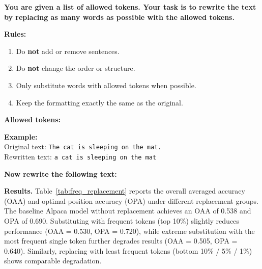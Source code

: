 \documentclass{article} %
\begin{document}
\begin{tcolorbox}[colback=gray!3, colframe=black!20, title=Replacement Prompt]
\textbf{You are given a list of allowed tokens. Your task is to rewrite the text by replacing as many words as possible with the allowed tokens.}

\vspace{0.5em}
\textbf{Rules:}
\begin{enumerate}
    \item Do \textbf{not} add or remove sentences. 
    \item Do \textbf{not} change the order or structure. 
    \item Only substitute words with allowed tokens when possible. 
    \item Keep the formatting exactly the same as the original. 
\end{enumerate}

\vspace{0.5em}
\textbf{Allowed tokens:} 

\vspace{0.5em}
\textbf{Example:} \\
Original text: \quad \texttt{The cat is sleeping on the mat.} \\
Rewritten text: \quad \texttt{a cat is sleeping on the mat}

\vspace{0.5em}
\textbf{Now rewrite the following text:} 
\end{tcolorbox}


\textbf{Results.}
Table~\ref{tab:freq_replacement} reports the overall averaged accuracy (OAA) and optimal-position accuracy (OPA) under different replacement groups. The baseline Alpaca model without replacement achieves an OAA of 0.538 and OPA of 0.690. Substituting with frequent tokens (top 10\%) slightly reduces performance (OAA = 0.530, OPA = 0.720), while extreme substitution with the most frequent single token further degrades results (OAA = 0.505, OPA = 0.640). Similarly, replacing with least frequent tokens (bottom 10\% / 5\% / 1\%) shows comparable degradation.
\end{document}
